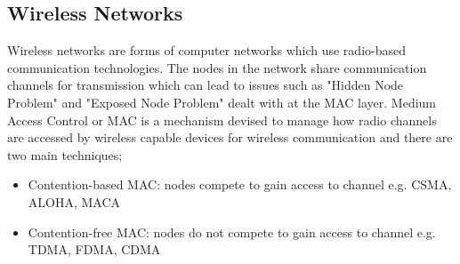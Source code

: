 \documentclass{article}
\begin{document}
\subsection{Wireless Networks}
Wireless networks are forms of computer networks which use radio-based communication technologies. The nodes in the network share communication channels for transmission which can lead to issues such as "Hidden Node Problem" and "Exposed Node Problem" dealt with at the MAC layer. Medium Access Control or MAC \citep{1010101} is a mechanism devised to manage how radio channels are accessed by wireless capable devices for wireless communication and there are two main techniques; 
	\begin{itemize}
		\item Contention-based MAC: nodes compete to gain access to channel e.g. CSMA, ALOHA, MACA
		\item Contention-free MAC: nodes do not compete to gain access to channel e.g. TDMA, FDMA, CDMA
	\end{itemize}
\end{document}
